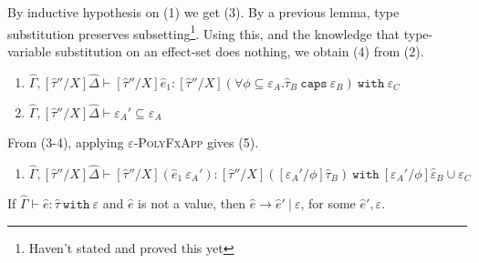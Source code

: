 \documentclass{llncs}
\newcommand{\keywadj}[1]{\mathtt{#1}}
\newcommand{\keyw}[1]{\keywadj{#1}~}
\newcommand{\kw}[1]{\keyw{ #1 }}
\begin{document}
By inductive hypothesis on (1) we get (3). By a previous lemma, type substitution preserves subsetting\footnote{Haven't stated and proved this yet}. Using this, and the knowledge that type-variable substitution on an effect-set does nothing, we obtain (4) from (2).

\begin{enumerate}
	\item $\hat \Gamma, [\hat \tau''/X]\hat \Delta \vdash [\hat \tau''/X]\hat e_1: [\hat \tau''/X](\forall \phi \subseteq \varepsilon_A. \hat \tau_B~\kw{caps} \varepsilon_B)~\kw{with} \varepsilon_C$
	\item $\hat \Gamma, [\hat \tau''/X]\hat \Delta \vdash\varepsilon_A' \subseteq \varepsilon_A$
\end{enumerate}

From (3-4), applying \textsc{$\varepsilon$-PolyFxApp} gives (5).

\begin{enumerate}
	\item $\hat \Gamma, [\hat \tau''/X]\hat \Delta \vdash [\hat \tau''/X](\hat e_1~\varepsilon_A'): [\hat \tau''/X]( [\varepsilon_A'/\phi]\hat \tau_B)~\kw{with} [\varepsilon_A'/\phi]\hat \varepsilon_B \cup \varepsilon_C$
\end{enumerate}




\hrulefill

\begin{theorem}[Progress]
If $\hat \Gamma \vdash \hat e: \hat \tau~\kw{with} \varepsilon$ and $\hat e$ is not a value, then $\hat e \longrightarrow \hat e'~|~\varepsilon$, for some $\hat e', \varepsilon$.
\end{theorem}
\end{document}
